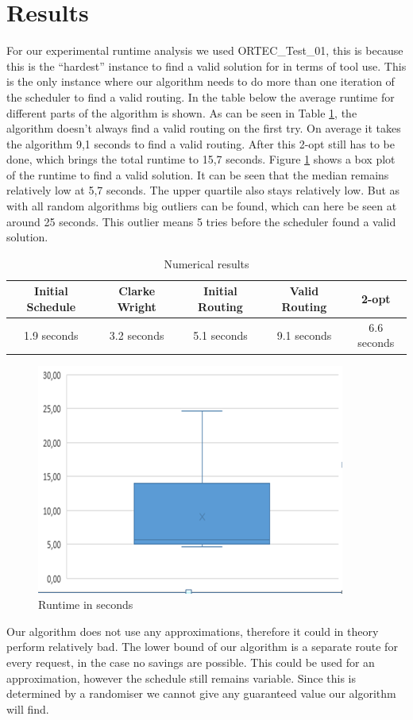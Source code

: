 \documentclass[a4paper]{article}
\begin{document}
\section{Results}
For our experimental runtime analysis we used ORTEC\_Test\_01, this is because this is the “hardest” instance to find a valid solution for in terms of tool use. This is the only instance where our algorithm needs to do more than one iteration of the scheduler to find a valid routing. In the table below the average runtime for different parts of the algorithm is shown. As can be seen in Table \ref{results}, the algorithm doesn’t always find a valid routing on the first try. On average it takes the algorithm 9,1 seconds to find a valid routing. After this 2-opt still has to be done, which brings the total runtime to 15,7 seconds. Figure \ref{fig:results} shows a box plot of the runtime to find a valid solution. It can be seen that the median remains relatively low at 5,7 seconds.  The upper quartile also stays relatively low. But as with all random algorithms big outliers can be found, which can here be seen at around 25 seconds. This outlier means 5 tries before the scheduler found a valid solution.

\begin{table}
	\centering
	\caption{Numerical results}
	\label{results}
	\begin{tabular}{ccccc}
		\toprule
		Initial Schedule & Clarke Wright & Initial Routing & Valid Routing & 2-opt \\ \midrule
		1.9 seconds & 3.2 seconds & 5.1 seconds & 9.1 seconds & 6.6 seconds \\
		\bottomrule
	\end{tabular}
\end{table}

\begin{figure}
	\center
	\caption{Runtime in seconds}
	\label{fig:results}
	\includegraphics[width=.5\textwidth]{results.PNG}
\end{figure}

Our algorithm does not use any approximations, therefore it could in theory perform relatively bad. The lower bound of our algorithm is a separate route for every request, in the case no savings are possible. This could be used for an approximation, however the schedule still remains variable. Since this is determined by a randomiser we cannot give any guaranteed value our algorithm will find. \\
 
\end{document}
